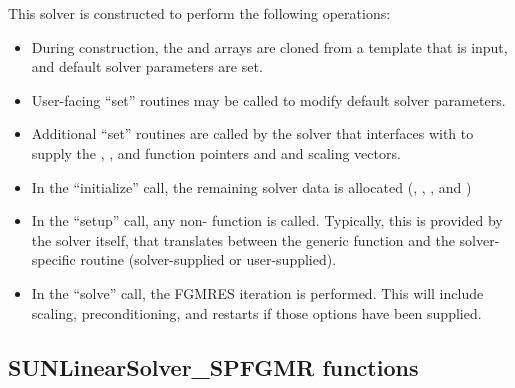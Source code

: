 This solver is constructed to perform the following operations:
\begin{itemize}
\item During construction, the  and  arrays are
  cloned from a template {\nvector} that is input, and default solver
  parameters are set.
\item User-facing ``set'' routines may be called to modify default
  solver parameters.
\item Additional ``set'' routines are called by the {\sundials} solver
  that interfaces with \newline {\sunlinsolspfgmr} to supply the
  , , and  function pointers and
   and  scaling vectors.
\item In the ``initialize'' call, the remaining solver data is
  allocated (, , , and  )
\item In the ``setup'' call, any non-
   function is called.  Typically, this is provided by
  the {\sundials} solver itself, that translates between the
  generic  function and the
  solver-specific routine (solver-supplied or user-supplied).
\item In the ``solve'' call, the FGMRES iteration is performed.  This
  will include scaling, preconditioning, and restarts if those options
  have been supplied.
\end{itemize}


\subsection{SUNLinearSolver\_SPFGMR functions}
\label{ss:sunlinsol_spfgmr_functions}

